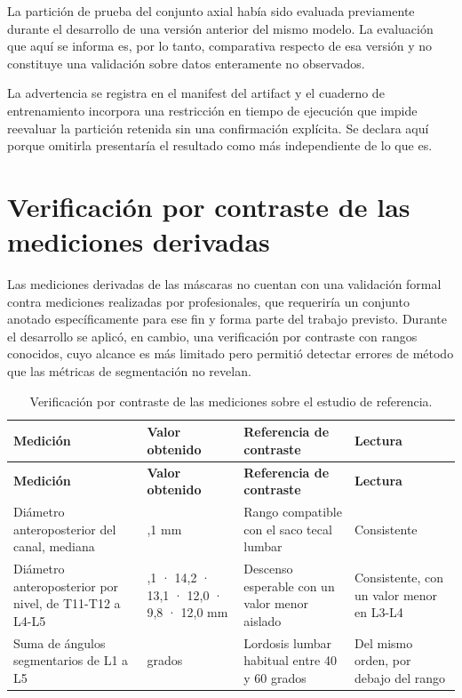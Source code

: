 La partición de prueba del conjunto axial había sido evaluada previamente durante el desarrollo de una versión anterior del mismo modelo. La evaluación que aquí se informa es, por lo tanto, comparativa respecto de esa versión y no constituye una validación sobre datos enteramente no observados.

La advertencia se registra en el manifest del artifact y el cuaderno de entrenamiento incorpora una restricción en tiempo de ejecución que impide reevaluar la partición retenida sin una confirmación explícita. Se declara aquí porque omitirla presentaría el resultado como más independiente de lo que es.

\section{Verificación por contraste de las mediciones derivadas}

Las mediciones derivadas de las máscaras no cuentan con una validación formal contra mediciones realizadas por profesionales, que requeriría un conjunto anotado específicamente para ese fin y forma parte del trabajo previsto. Durante el desarrollo se aplicó, en cambio, una verificación por contraste con rangos conocidos, cuyo alcance es más limitado pero permitió detectar errores de método que las métricas de segmentación no revelan.

{\scriptsize
\setlength{\LTleft}{0pt}
\setlength{\LTright}{0pt}
\setlength{\tabcolsep}{3pt}
\renewcommand{\arraystretch}{1.18}
\begin{longtable}{>{\raggedright\arraybackslash}p{} >{\raggedright\arraybackslash}p{} >{\raggedright\arraybackslash}p{} >{\raggedright\arraybackslash}p{}}
\caption{Verificación por contraste de las mediciones sobre el estudio de referencia.}\label{tab:res-contraste-mediciones}\\
\hline
\textbf{Medición} & \textbf{Valor obtenido} & \textbf{Referencia de contraste} & \textbf{Lectura} \\
\hline
\endfirsthead
\hline
\textbf{Medición} & \textbf{Valor obtenido} & \textbf{Referencia de contraste} & \textbf{Lectura} \\
\hline
\endhead
\hline
\endfoot
Diámetro anteroposterior del canal, mediana & 13,1 mm & Rango compatible con el saco tecal lumbar & Consistente \\
Diámetro anteroposterior por nivel, de T11-T12 a L4-L5 & 13,1 · 14,2 · 13,1 · 12,0 · 9,8 · 12,0 mm & Descenso esperable con un valor menor aislado & Consistente, con un valor menor en L3-L4 \\
Suma de ángulos segmentarios de L1 a L5 & 36 grados & Lordosis lumbar habitual entre 40 y 60 grados & Del mismo orden, por debajo del rango \\
\hline
\end{longtable}
}

